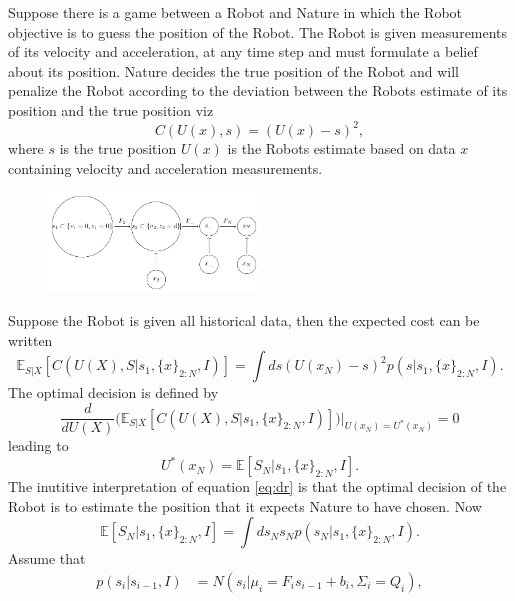 \begin{example}
	Suppose there is a game between a Robot and Nature in which the Robot objective is to guess the position of the Robot. The Robot is given measurements of its velocity and acceleration, at any time step and must formulate a belief about its position. Nature decides the true position of the Robot and will penalize the Robot according to the deviation between the Robots estimate of its position and the true position viz
	\begin{equation}
		C(U(x),s) = (U(x)-s)^2,
	\end{equation}
	where $s$ is the true position $U(x)$ is the Robots estimate based on data $x$ containing velocity and acceleration measurements. 
	\begin{figure}[H]
		\centering
		\includegraphics[width = 0.5\textwidth]{figures/graph.pdf}
		\caption{}
		\label{fig:1}
	\end{figure}
	Suppose the Robot is given all historical data, then the expected cost can be written
	\begin{equation}
		\mathbb{E}_{S|X}[C(U(X),S|s_1,\{x\}_{2:N},I)] = \int ds (U(x_N)-s)^2p(s|s_1,\{x\}_{2:N},I).
	\end{equation}
	The optimal decision is defined by
	\begin{equation}
		\frac{d}{dU(X)}\bigg(\mathbb{E}_{S|X}[C(U(X),S|s_1,\{x\}_{2:N},I)]\bigg)\bigg|_{U(x_N)=U^*(x_N)} = 0
	\end{equation}
	leading to 
	\begin{equation}
		U^*(x_N) = \mathbb{E}[S_{N}|s_1,\{x\}_{2:N},I].
		\label{eq:dr}
	\end{equation}
	The inutitive interpretation of equation \eqref{eq:dr} is that the optimal decision of the Robot is to estimate the position that it expects Nature to have chosen. Now
	\begin{equation}
		\mathbb{E}[S_{N}|s_1,\{x\}_{2:N},I] = \int ds_{N} s_N p(s_N|s_1,\{x\}_{2:N},I).
		\label{eq:a5}
	\end{equation}
	Assume that
	\begin{equation}
		\begin{split}
			p(s_i|s_{i-1},I) &= N(s_i|\mu_i = F_is_{i-1}+b_i,\Sigma_i = Q_i),\\

\end{split}
\end{equation}
\end{example}
